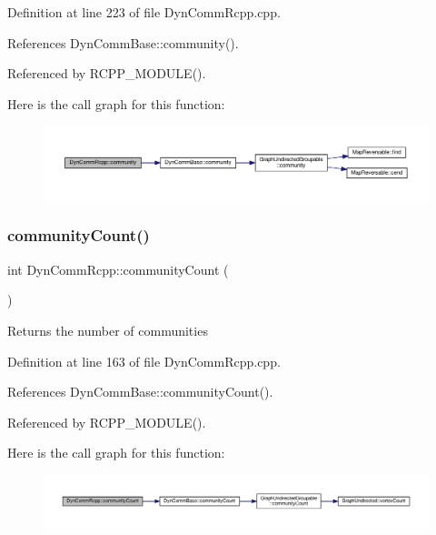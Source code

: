 Definition at line 223 of file Dyn\+Comm\+Rcpp.\+cpp.



References Dyn\+Comm\+Base\+::community().



Referenced by R\+C\+P\+P\+\_\+\+M\+O\+D\+U\+L\+E().

Here is the call graph for this function\+:\nopagebreak
\begin{figure}[H]
\begin{center}
\leavevmode
\includegraphics[width=350pt]{classDynCommRcpp_ac3c8c1759d2ab106b757557e09834ec5_cgraph}
\end{center}
\end{figure}
\mbox{\label{classDynCommRcpp_a67948d5821c2ccffc4dbf47bac6fba70}} 
\subsubsection{\texorpdfstring{community\+Count()}{communityCount()}}
{\footnotesize\ttfamily int Dyn\+Comm\+Rcpp\+::community\+Count (\begin{DoxyParamCaption}{ }\end{DoxyParamCaption})\hspace{0.3cm}{\ttfamily [inline]}}

\begin{DoxyReturn}{Returns}
the number of communities 
\end{DoxyReturn}


Definition at line 163 of file Dyn\+Comm\+Rcpp.\+cpp.



References Dyn\+Comm\+Base\+::community\+Count().



Referenced by R\+C\+P\+P\+\_\+\+M\+O\+D\+U\+L\+E().

Here is the call graph for this function\+:\nopagebreak
\begin{figure}[H]
\begin{center}
\leavevmode
\includegraphics[width=350pt]{classDynCommRcpp_a67948d5821c2ccffc4dbf47bac6fba70_cgraph}
\end{center}
\end{figure}
\mbox{\label{classDynCommRcpp_ad74a2abe244e62d9df2b98aeea0d3155}} 
